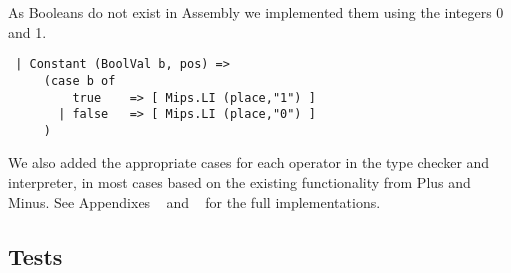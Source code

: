 \documentclass{article}
\begin{document}
\noindent As Booleans do not exist in Assembly we implemented them using the integers 0 and 1.
\begin{verbatim}
 | Constant (BoolVal b, pos) => 
     (case b of
         true    => [ Mips.LI (place,"1") ]
       | false   => [ Mips.LI (place,"0") ]
     )
\end{verbatim}

We also added the appropriate cases for each operator in the type checker and interpreter, in most cases based on the existing functionality from Plus and Minus.
See Appendixes ~ and ~ for the full implementations.

\subsection{Tests}
\end{document}
